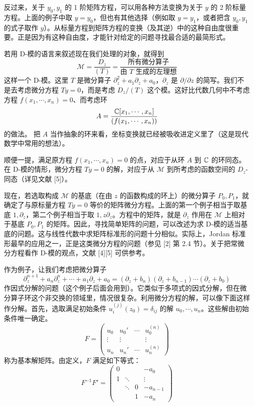 反过来，关于 $y_0,y_1$ 的 1 阶矩阵方程，可以用各种方法变换为关于 $y$ 的 2 阶标量方程。上面的例子中取 $y=y_0$，但也有其他选择（例如取 $y=y_1$，或者把含 $y_0,y_1$ 的式子取作 $y$）。从标量方程到矩阵方程的变换（及其逆）中的这种自由度很重要。正是因为有这种自由度，才能针对给定的问题寻找最合适的最简形式。

若用 D-模的语言来叙述现在我们处理的对象，就得到
\[
\mathcal{M}=\frac{D_z}{(T)}=\frac{\text{所有微分算子}}{\text{由 }T\text{ 生成的左理想}}
\]
这样一个 D-模。这里 $T$ 是微分算子 $\partial_z^2+a_1\partial_z+a_0$，$\partial_z$ 是 $\partial/\partial z$ 的简写。我们不是去考虑微分方程 $Ty=0$，而是考虑 $D_z/(T)$ 这个模。这好比代数几何中不考虑方程 $f(x_1,\cdots,x_n)=0$、而考虑环
\[
A=\frac{\mathbb{C}[x_1,\cdots,x_n]}{(f(x_1,\cdots,x_n))}
\]
的做法。
把 $A$ 当作抽象的环来看，坐标变换就已经被吸收进定义里了（这是现代数学中常用的想法）。

顺便一提，满足原方程 $f(x_1,\cdots,x_n)=0$ 的点，对应于从环 $A$ 到 $\mathbb{C}$ 的环同态。在 D-模的情形，微分方程 $Ty=0$ 的解，对应于从 $\mathcal{M}$ 到所考虑的函数空间的 $D_z$-同态（详见文献 [5]）。

现在，若选取构成 $\mathcal{M}$ 的基底（在由 $z$ 的函数构成的环上）的微分算子 $P_0,P_1$，就确定了与原标量方程 $Ty=0$ 等价的矩阵微分方程。上面的第一个例子相当于取基底 $1,\partial_z$，第二个例子相当于取 $1,z\partial_z$。方程中的矩阵，就是 $\partial_z$ 作用在 $\mathcal{M}$ 上相对于基底 $P_0,P_1$ 的矩阵。因此，寻找简单矩阵的问题，可以改述为求 D-模的适当基底的问题。这与线性代数中求矩阵标准形的问题十分相似。实际上，Jordan 标准形最早的应用之一，正是这类微分方程的问题（参见 [2] 第 2.4 节）。关于把常微分方程看作 D-模的观点，文献 [4][5] 可供参考。

作为例子，让我们考虑把微分算子
\[
\partial_z^{n+1}+a_n\partial_z^n+\cdots+a_1\partial_z+a_0
=(\partial_z+b_n)(\partial_z+b_{n-1})\cdots(\partial_z+b_0)
\]
作因式分解的问题（这个例子后面会用到）。它类似于多项式的因式分解，但在微分算子环这个非交换的领域里，情况很复杂。利用微分方程的解，可以像下面这样作分解。首先，选取满足初始条件 $u_i^{(j)}(z_0)=\delta_{ij}$ 的解 $u_0,\cdots,u_n$。这些解由初始条件唯一确定。
\[
F=
\begin{pmatrix}
u_0&u_0'&\cdots&u_0^{(n)}\\
\vdots&\vdots&&\vdots\\
u_n&u_n'&\cdots&u_n^{(n)}
\end{pmatrix}
\]
称为基本解矩阵。由定义，$F$ 满足如下等式：
\[
F^{-1}F'=
\begin{pmatrix}
0&&&-a_0\\
1&\ddots&&\vdots\\
&\ddots&0&-a_{n-1}\\
&&1&-a_n
\end{pmatrix}
\]

